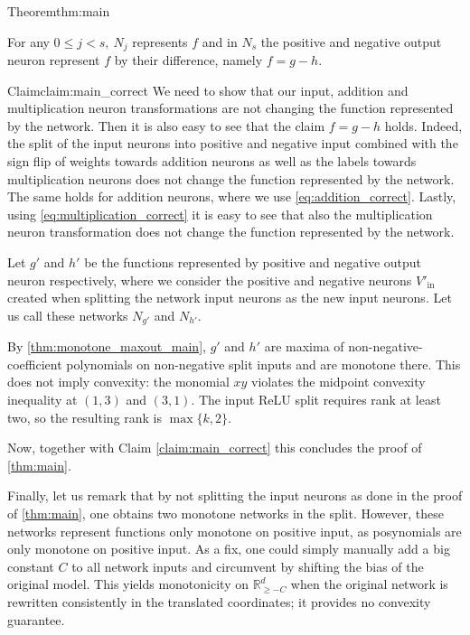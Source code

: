 \begin{proofref}{Theorem}{thm:main}
    \begin{claim}[Correctness] \label{claim:main_correct}
        For any $0 \leq j < s, \ N_j$ represents $f$ and in $N_s$ the positive and negative output neuron represent $f$ by their difference, namely $f = g - h$.
    \end{claim}

    \begin{proofref}{Claim}{claim:main_correct}
        We need to show that our input, addition and multiplication neuron transformations are not changing the function represented by the network.
        Then it is also easy to see that the claim $f = g - h$ holds.
        Indeed, the split of the input neurons into positive and negative input combined with the sign flip of weights towards addition neurons as well as the labels towards multiplication neurons does not change the function represented by the network.
        The same holds for addition neurons, where we use \cref{eq:addition_correct}. Lastly, using \cref{eq:multiplication_correct} it is easy to see that also the multiplication neuron transformation does not change the function represented by the network.
    \end{proofref}

    Let $g'$ and $h'$ be the functions represented by positive and negative output neuron respectively, where we consider the positive and negative neurons $V'_{\text{in}}$ created when splitting the network input neurons as the new input neurons.
    Let us call these networks $N_{g'}$ and $N_{h'}$.

    By \cref{thm:monotone_maxout_main}, $g'$ and $h'$ are maxima of non-negative-coefficient polynomials on non-negative split inputs and are monotone there. This does not imply convexity: the monomial $xy$ violates the midpoint convexity inequality at $(1,3)$ and $(3,1)$. The input ReLU split requires rank at least two, so the resulting rank is $\max\{k,2\}$.

    Now, together with Claim \ref{claim:main_correct} this concludes the proof of \cref{thm:main}.
\end{proofref}

Finally, let us remark that by not splitting the input neurons as done in the proof of \cref{thm:main}, one obtains two monotone networks in the split. However, these networks represent functions only monotone on positive input, as posynomials are only monotone on positive input.
As a fix, one could simply manually add a big constant $C$ to all network inputs and circumvent by shifting the bias of the original model. This yields monotonicity on $\mathbb{R}_{\geq-C}^d$ when the original network is rewritten consistently in the translated coordinates; it provides no convexity guarantee.